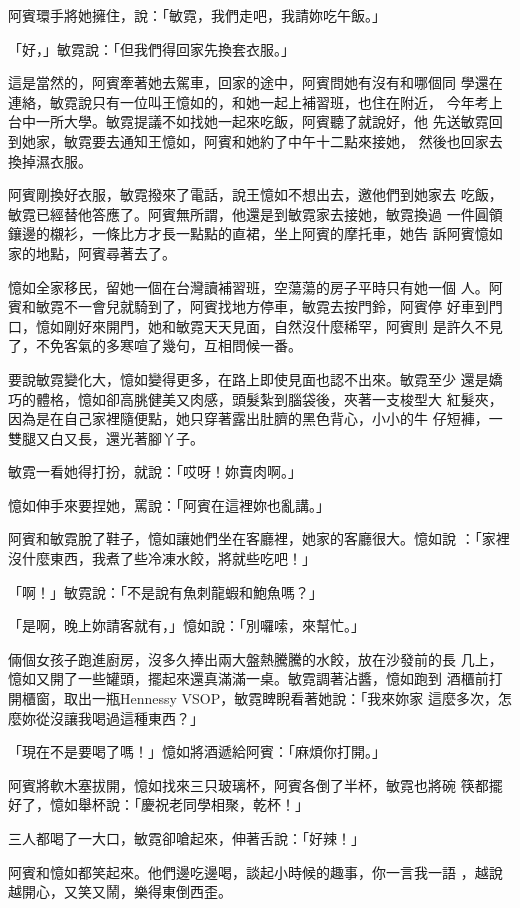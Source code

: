 阿賓環手將她擁住，說：「敏霓，我們走吧，我請妳吃午飯。」

「好，」敏霓說：「但我們得回家先換套衣服。」

這是當然的，阿賓牽著她去駕車，回家的途中，阿賓問她有沒有和哪個同
學還在連絡，敏霓說只有一位叫王憶如的，和她一起上補習班，也住在附近，
今年考上台中一所大學。敏霓提議不如找她一起來吃飯，阿賓聽了就說好，他
先送敏霓回到她家，敏霓要去通知王憶如，阿賓和她約了中午十二點來接她，
然後也回家去換掉濕衣服。

阿賓剛換好衣服，敏霓撥來了電話，說王憶如不想出去，邀他們到她家去
吃飯，敏霓已經替他答應了。阿賓無所謂，他還是到敏霓家去接她，敏霓換過
一件圓領鑲邊的櫬衫，一條比方才長一點點的直裙，坐上阿賓的摩托車，她告
訴阿賓憶如家的地點，阿賓尋著去了。

憶如全家移民，留她一個在台灣讀補習班，空蕩蕩的房子平時只有她一個
人。阿賓和敏霓不一會兒就騎到了，阿賓找地方停車，敏霓去按門鈴，阿賓停
好車到門口，憶如剛好來開門，她和敏霓天天見面，自然沒什麼稀罕，阿賓則
是許久不見了，不免客氣的多寒喧了幾句，互相問候一番。

要說敏霓變化大，憶如變得更多，在路上即使見面也認不出來。敏霓至少
還是嬌巧的體格，憶如卻高朓健美又肉感，頭髮紮到腦袋後，夾著一支梭型大
紅髮夾，因為是在自己家裡隨便點，她只穿著露出肚臍的黑色背心，小小的牛
仔短褲，一雙腿又白又長，還光著腳丫子。

敏霓一看她得打扮，就說：「哎呀！妳賣肉啊。」

憶如伸手來要捏她，罵說：「阿賓在這裡妳也亂講。」

阿賓和敏霓脫了鞋子，憶如讓她們坐在客廳裡，她家的客廳很大。憶如說
：「家裡沒什麼東西，我煮了些冷凍水餃，將就些吃吧！」

「啊！」敏霓說：「不是說有魚刺龍蝦和鮑魚嗎？」

「是啊，晚上妳請客就有，」憶如說：「別囉嗦，來幫忙。」

倆個女孩子跑進廚房，沒多久捧出兩大盤熱騰騰的水餃，放在沙發前的長
几上，憶如又開了一些罐頭，擺起來還真滿滿一桌。敏霓調著沾醬，憶如跑到
酒櫃前打開櫃窗，取出一瓶Hennessy VSOP，敏霓睥睨看著她說：「我來妳家
這麼多次，怎麼妳從沒讓我喝過這種東西？」

「現在不是要喝了嗎！」憶如將酒遞給阿賓：「麻煩你打開。」

阿賓將軟木塞拔開，憶如找來三只玻璃杯，阿賓各倒了半杯，敏霓也將碗
筷都擺好了，憶如舉杯說：「慶祝老同學相聚，乾杯！」

三人都喝了一大口，敏霓卻嗆起來，伸著舌說：「好辣！」

阿賓和憶如都笑起來。他們邊吃邊喝，談起小時候的趣事，你一言我一語
，越說越開心，又笑又鬧，樂得東倒西歪。

